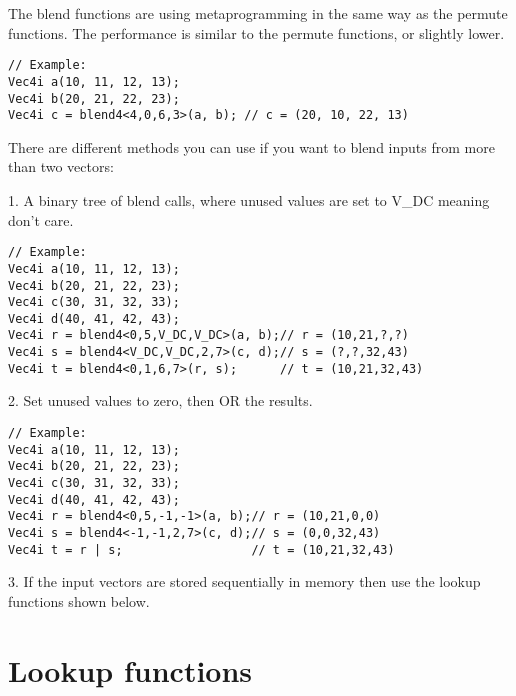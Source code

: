 \documentclass[vcl_manual.tex]{subfiles}
\begin{document}
The blend functions are using metaprogramming in the same way as the permute functions. The performance is similar to the permute functions, or slightly lower.

\begin{lstlisting}[frame=none]
// Example:
Vec4i a(10, 11, 12, 13);
Vec4i b(20, 21, 22, 23);
Vec4i c = blend4<4,0,6,3>(a, b); // c = (20, 10, 22, 13)
\end{lstlisting}

There are different methods you can use if you want to blend inputs from more than two vectors: 

1. A binary tree of blend calls, where unused values are set to V\_DC meaning don't care.
\begin{lstlisting}[frame=none]
// Example:
Vec4i a(10, 11, 12, 13);
Vec4i b(20, 21, 22, 23);
Vec4i c(30, 31, 32, 33);
Vec4i d(40, 41, 42, 43);
Vec4i r = blend4<0,5,V_DC,V_DC>(a, b);// r = (10,21,?,?)
Vec4i s = blend4<V_DC,V_DC,2,7>(c, d);// s = (?,?,32,43)
Vec4i t = blend4<0,1,6,7>(r, s);      // t = (10,21,32,43)
\end{lstlisting}

2. Set unused values to zero, then OR the results.
\begin{lstlisting}[frame=none]
// Example:
Vec4i a(10, 11, 12, 13);
Vec4i b(20, 21, 22, 23);
Vec4i c(30, 31, 32, 33);
Vec4i d(40, 41, 42, 43);
Vec4i r = blend4<0,5,-1,-1>(a, b);// r = (10,21,0,0)
Vec4i s = blend4<-1,-1,2,7>(c, d);// s = (0,0,32,43)
Vec4i t = r | s;                  // t = (10,21,32,43)
\end{lstlisting}

3. If the input vectors are stored sequentially in memory then use the lookup functions shown below.


\section{Lookup functions}\label{LookupFunctions}
\end{document}
